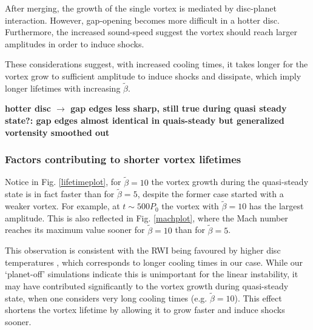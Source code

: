 After merging, the growth of the single vortex is mediated by disc-planet
interaction. However, gap-opening becomes more difficult in a hotter 
disc. %
Furthermore, the increased sound-speed suggest the vortex should    
reach larger amplitudes in order to induce shocks. 

These considerations suggest, with increased cooling times, 
it takes longer for the vortex grow to sufficient amplitude to induce 
shocks and dissipate, which imply longer lifetimes with increasing 
$\tilde{\beta}$.      

{\bf hotter disc $\to$ gap edges less sharp, still true during quasi
  steady state?: gap edges almost identical in quais-steady but generalized vortensity smoothed out}

\subsubsection{Factors contributing to shorter vortex lifetimes} 
Notice in Fig. \ref{lifetimeplot}, for $\tilde{\beta}=10$ the vortex 
growth during the quasi-steady state is in fact faster than for
$\tilde{\beta}=5$, despite the former case started with a weaker
vortex. For example, at $t\sim 500P_0$ the vortex with   
$\tilde{\beta}=10$ has the largest amplitude. This is also reflected
in Fig. \ref{machplot}, where the Mach number reaches its maximum
value sooner for $\tilde{\beta}=10$ than for $\tilde{\beta}=5$. 

This observation is consistent with the RWI being favoured by higher
disc temperatures \citep{li00,lin12c}, which corresponds to longer
cooling times in our case. While our `planet-off' simulations indicate
this is unimportant for the linear instability, it may have contributed 
significantly to the vortex growth during quasi-steady state, when one
considers very long cooling times (e.g. $\tilde{\beta}=10$). This
effect shortens the vortex lifetime by allowing it to grow
faster and induce shocks sooner. 

%
